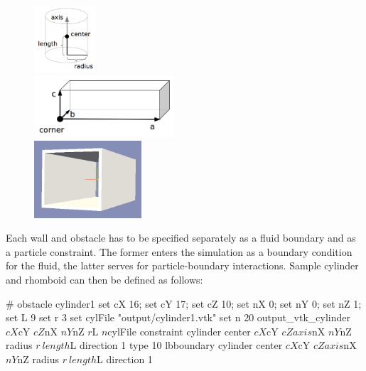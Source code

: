 \documentclass[
a4paper,                        %
11pt,                           %
twoside,                        %
footsepline,                    %
headsepline,                    %
headexclude,                    %
footexclude,                    %
pagesize,                       %
]{scrartcl}
\begin{document}
\begin{figure}[htbp]
  \hfill
  \begin{minipage}[t]{.22\textwidth}
      \includegraphics[width=2.3cm,right]{figures/cylinder.png}
  \end{minipage}
  \hfill
  \begin{minipage}[t]{.45\textwidth}
   \begin{center}  
      \includegraphics[width=5.2cm]{figures/rhomboid.png}     
    \end{center}
  \end{minipage}
  \hfill
  \begin{minipage}[t]{.3\textwidth}
      \includegraphics[width=4cm,left]{figures/channel.png} 
  \end{minipage}
  \hfill
\end{figure} 

Each wall and obstacle has to be specified separately as a fluid boundary and as a particle constraint. The former enters the simulation as a boundary condition for the fluid, the latter serves for particle-boundary interactions. Sample cylinder and rhomboid can then be defined as follows:\\
 \begin{tclcode}
# obstacle cylinder1 
set cX 16; set cY 17; set cZ 10;
set nX 0; set nY 0; set nZ 1;
set L 9
set r 3
set cylFile "output/cylinder1.vtk"
set n 20
output_vtk_cylinder $cX $cY $cZ $nX $nY $nZ $r $L $n $cylFile
constraint cylinder center $cX $cY $cZ axis $nX $nY $nZ radius $r \
length $L direction 1 type 10 
lbboundary cylinder center $cX $cY $cZ axis $nX $nY $nZ radius $r \
length $L direction 1
 \end{tclcode}
\vspace{0 mm}
\end{document}
